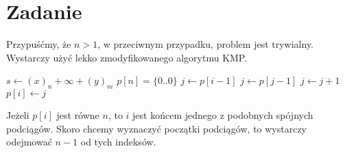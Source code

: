 \documentclass[12pt, a4paper]{article}
\newcounter{zadanie}
\newcommand{\zadanie}{\addtocounter{zadanie}{1}\section*{Zadanie \arabic{zadanie}}}
\begin{document}
\newpage\zadanie{}
Przypuśćmy, że $n>1$, w przeciwnym przypadku, problem jest trywialny. Wystarczy
użyć lekko zmodyfikowanego algorytmu KMP.
\begin{algorithmic}

    \State $s \gets (x)_n + \infty + (y)_m$
    \State $p[n] = \{0..0\}$
      \State $j \gets p[i-1]$
        \State $j \gets p[j-1]$
      \EndWhile
        \State $j \gets j + 1$
      \EndIf
      \State $p[i] \gets j$
    \EndFor
  \EndFunction

\end{algorithmic}
Jeżeli $p[i]$ jest równe $n$, to $i$ jest końcem jednego z podobnych spójnych podciągów.
Skoro chcemy wyznaczyć początki podciągów, to wystarczy odejmować $n-1$ od tych indeksów.
\end{document}
